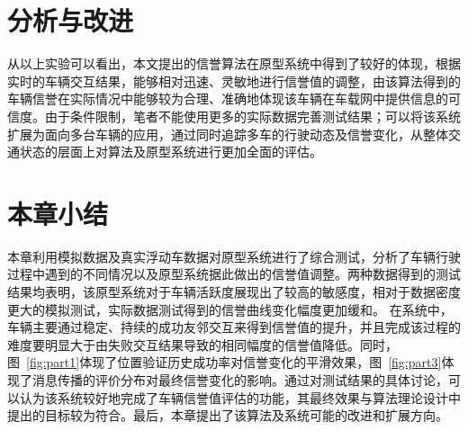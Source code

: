 \section{分析与改进}
从以上实验可以看出，本文提出的信誉算法在原型系统中得到了较好的体现，根据实时的车辆交互结果，能够相对迅速、灵敏地进行信誉值的调整，由该算法得到的车辆信誉在实际情况中能够较为合理、准确地体现该车辆在车载网中提供信息的可信度。由于条件限制，笔者不能使用更多的实际数据完善测试结果；可以将该系统扩展为面向多台车辆的应用，通过同时追踪多车的行驶动态及信誉变化，从整体交通状态的层面上对算法及原型系统进行更加全面的评估。

\section{本章小结}
本章利用模拟数据及真实浮动车数据对原型系统进行了综合测试，分析了车辆行驶过程中遇到的不同情况以及原型系统据此做出的信誉值调整。两种数据得到的测试结果均表明，该原型系统对于车辆活跃度展现出了较高的敏感度，相对于数据密度更大的模拟测试，实际数据测试得到的信誉曲线变化幅度更加缓和。
在系统中，车辆主要通过稳定、持续的成功友邻交互来得到信誉值的提升，并且完成该过程的难度要明显大于由失败交互结果导致的相同幅度的信誉值降低。同时，图~\ref{fig:part1}体现了位置验证历史成功率对信誉变化的平滑效果，图~\ref{fig:part3}体现了消息传播的评价分布对最终信誉变化的影响。通过对测试结果的具体讨论，可以认为该系统较好地完成了车辆信誉值评估的功能，其最终效果与算法理论设计中提出的目标较为符合。最后，本章提出了该算法及系统可能的改进和扩展方向。